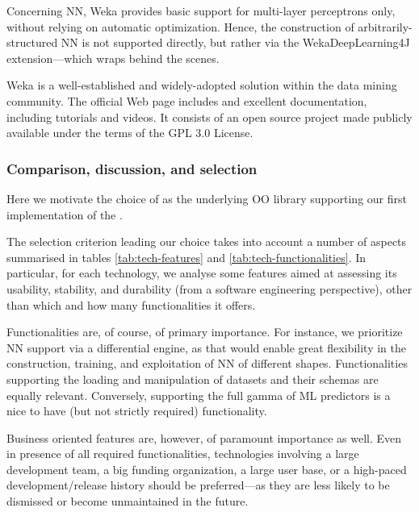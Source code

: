 \documentclass[12pt,a4paper,openright,twoside]{book}
\begin{document}
Concerning NN, Weka provides basic support for multi-layer perceptrons only, without relying on automatic optimization.
%
Hence, the construction of arbitrarily-structured NN is not supported directly, but rather via the WekaDeepLearning4J extension\footnotemark---which wraps \dlfj{} behind the scenes.
%

Weka is a well-established and widely-adopted solution within the data mining community.
%
The official Web page includes and excellent documentation, including tutorials and videos.
%
It consists of an open source project made publicly available under the terms of the GPL 3.0 License.

\subsubsection{Comparison, discussion, and selection}



Here we motivate the choice of \dlfj{} as the underlying OO library supporting our first implementation of the \mllib{}.

The selection criterion leading our choice takes into account a number of aspects summarised in tables \ref{tab:tech-features} and \ref{tab:tech-functionalities}.
%
In particular, for each technology, we analyse some features aimed at assessing its usability, stability, and durability (from a software engineering perspective), other than which and how many functionalities it offers.

Functionalities are, of course, of primary importance.
%
For instance, we prioritize NN support via a differential engine, as that would enable great flexibility in the construction, training, and exploitation of NN of different shapes.
%
Functionalities supporting the loading and manipulation of datasets and their schemas are equally relevant.
%
Conversely, supporting the full gamma of ML predictors is a nice to have (but not strictly required) functionality.

Business oriented features are, however, of paramount importance as well.
%
Even in presence of all required functionalities, technologies involving a large development team, a big funding organization, a large user base, or a high-paced development/release history should be preferred---as they are less likely to be dismissed or become unmaintained in the future.
%
\end{document}
